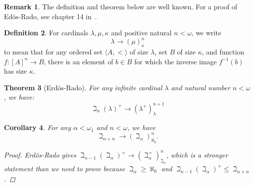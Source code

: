 \documentclass{amsart}
\newtheorem{theorem}{Theorem}[section]
\newtheorem{corollary}[theorem]{Corollary}
\theoremstyle{definition}
\newtheorem{remark}[theorem]{Remark}
\newtheorem{definition}[theorem]{Definition}
\numberwithin{equation}{theorem}
\newcommand{\narrow}[1]{\xrightarrow{#1}}
\renewcommand{\to}{\narrow{}}
\begin{document}
\begin{remark}
  The definition and theorem below are well known.
  For a proof of Ed\"os-Rado, see chapter 14 in~\cite{keisler1971model}.
\end{remark}
\begin{definition}
  For cardinals $\lambda,\mu,\kappa$ and positive natural $n<\omega$, we write
  \[
    \lambda\to(\mu)_\kappa^n
  \]
  to mean that for any ordered set $\langle A,<\rangle$ of size $\lambda$, set $B$ of size $\kappa$, and function $f:[A]^n\to B$, there is an element of $b\in B$ for which the inverse image $f^{-1}(b)$ has size $\kappa$.
\end{definition}
\begin{theorem}[Erd\"os-Rado]\label{thm:erdos-rado}
  For any infinite cardinal $\lambda$ and natural number $n<\omega$, we have:
  \[
    \beth_n(\lambda)^+\rightarrow(\lambda^+)^{n+1}_\lambda
  \]
\end{theorem}
\begin{corollary}\label{cor:erdos-rado-omega}
  For any $\alpha<\omega_1$ and $n<\omega$, we have 
  \[
    \beth_{\alpha+n}\rightarrow(\beth_\alpha)^n_{\aleph_0}.
  \]
  \begin{proof}
    Erd\"os-Rado gives $\beth_{n-1}(\beth_\alpha)^+\rightarrow(\beth_\alpha^+)^n_{\beth_\alpha}$, which is a stronger statement than we need to prove because $\beth_\alpha\geq\aleph_0$ and $\beth_{n-1}(\beth_\alpha)^+\leq\beth_{\alpha+n}$.
  \end{proof}
\end{corollary}
\end{document}
